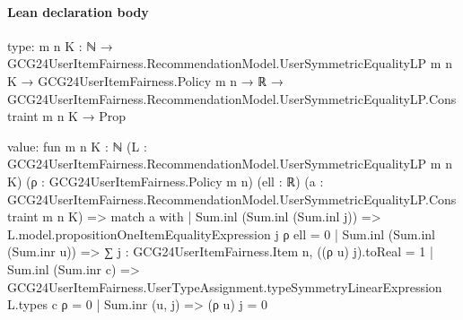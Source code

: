 \documentclass[10pt]{article}
\begin{document}
\paragraph{Lean declaration body}
\begin{ReviewVerbatim}
type:
{m n K : ℕ} →
  GCG24UserItemFairness.RecommendationModel.UserSymmetricEqualityLP m n K →
    GCG24UserItemFairness.Policy m n →
      ℝ → GCG24UserItemFairness.RecommendationModel.UserSymmetricEqualityLP.Constraint m n K → Prop

value:
fun {m n K : ℕ} (L : GCG24UserItemFairness.RecommendationModel.UserSymmetricEqualityLP m n K)
    (ρ : GCG24UserItemFairness.Policy m n) (ell : ℝ)
    (a : GCG24UserItemFairness.RecommendationModel.UserSymmetricEqualityLP.Constraint m n K) =>
  match a with
  | Sum.inl (Sum.inl (Sum.inl j)) => L.model.propositionOneItemEqualityExpression j ρ ell = 0
  | Sum.inl (Sum.inl (Sum.inr u)) => ∑ j : GCG24UserItemFairness.Item n, ((ρ u) j).toReal = 1
  | Sum.inl (Sum.inr c) => GCG24UserItemFairness.UserTypeAssignment.typeSymmetryLinearExpression L.types c ρ = 0
  | Sum.inr (u, j) => (ρ u) j = 0
\end{ReviewVerbatim}
\end{document}

